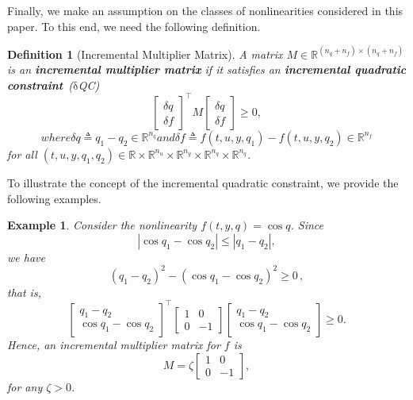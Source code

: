 \documentclass[times, doublespace]{rncauth}
\newcommand{\iqc}{$\mathrm{\delta}$QC}
\newtheorem{example}{Example}
\newtheorem{definition}{Definition}
\begin{document}
Finally, we make an assumption on the classes of nonlinearities considered in this paper. To this end, we need the following definition.
\begin{definition}[Incremental Multiplier Matrix]
A matrix $M\in\mathbb{R}^{(n_q+n_f)\times (n_q+n_f)}$ is an \textbf{incremental multiplier matrix} if it satisfies an \textbf{incremental quadratic constraint}~(\iqc)
	\begin{equation}
	\label{eq:iqc}
	\begin{bmatrix}
	\delta q  \\ \delta f
	\end{bmatrix}^\top M \begin{bmatrix}
	\delta q \\ \delta f
	\end{bmatrix} \ge 0,
	\end{equation}
	\begin{subequations}\label{eq:del_qp}
		where \begin{equation}
		\delta q \triangleq q_1 - q_2 \in\mathbb{R}^{n_q}
		\end{equation} 
		and 
		\begin{equation}
		\delta f \triangleq f(t, u, y, q_1) - f(t, u, y, q_2) \in\mathbb{R}^{n_f}
		\end{equation}
	\end{subequations}
	for all $(t,u,y,q_1,q_2) \in\mathbb{R}\times\mathbb{R}^{n_u} \times\mathbb{R}^{n_y} \times\mathbb{R}^{n_q}\times \mathbb{R}^{n_q}$.
\end{definition}
To illustrate the concept of the incremental quadratic constraint, we provide the following examples.
\begin{example}
Consider the nonlinearity $f(t,y,q) =\cos q$. Since
\[
|\cos q_1-\cos q_2| \le |q_1-q_2|,
\]
we have 
\[
(q_1-q_2)^2 - (\cos q_1-\cos q_2)^2 \ge 0\,,
\]
that is,
\[
\begin{bmatrix}
q_1 - q_2 \\ \cos q_1 -\cos {q_2}
\end{bmatrix}^\top \begin{bmatrix}
1 & 0 \\ 0 & -1
\end{bmatrix}\begin{bmatrix}
q_1 - q_2 \\ \cos q_1 -\cos {q_2}
\end{bmatrix}\ge 0.
\]
Hence, an incremental multiplier matrix for $f$ is
\begin{equation}\label{eq:imm1}
M = \zeta\begin{bmatrix}
1 & 0 \\ 0 & -1
\end{bmatrix},
\end{equation}
for any $\zeta>0$.
\end{example}
\end{document}

